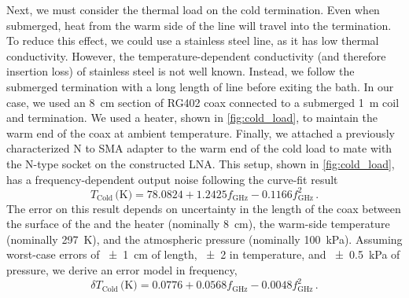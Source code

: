 Next, we must consider the thermal load on the cold termination.
Even when submerged, heat from the warm side of the line will travel into the termination.
To reduce this effect, we could use a stainless steel line, as it has low thermal conductivity.
However, the temperature-dependent conductivity (and therefore insertion loss) of stainless steel is not well known.
Instead, we follow the submerged termination with a long length of line before exiting the bath.
In our case, we used an \qty{8}{\cm} section of RG402 coax connected to a submerged \qty{1}{\m} coil and termination.
We used a heater, shown in \autoref{fig:cold_load}, to maintain the warm end of the coax at ambient temperature.
Finally, we attached a previously characterized N to SMA adapter to the warm end of the cold load to mate with the N-type socket on the constructed LNA.
This setup, shown in \autoref{fig:cold_load}, has a frequency-dependent output noise following the curve-fit result
%
\begin{equation}
	T_{\text{Cold}}\,\text{(K)} = 78.0824 + 1.2425f_{\si{\GHz}} -  0.1166f_{\si{\GHz}}^{2} \,.
	\label{eqn:tcold}
\end{equation}
%
The error on this result depends on uncertainty in the length of the coax between the surface of the \LN{} and the heater (nominally \qty{8}{\cm}), the warm-side temperature (nominally \qty{297}{\K}), and the atmospheric pressure (nominally \qty{100}{\kilo\Pa}).
Assuming worst-case errors of \qty{\pm 1}{\cm} of length, \qty{\pm 2}{\C} in temperature, and \qty{\pm 0.5}{\kilo\Pa} of pressure, we derive an error model in frequency,
%
\begin{equation}
	\delta T_{\text{Cold}}\,\text{(K)} = 0.0776 + 0.0568f_{\si{\GHz}} - 0.0048f_{\si{\GHz}}^{2} \,.
	\label{eqn:terr}
\end{equation}

